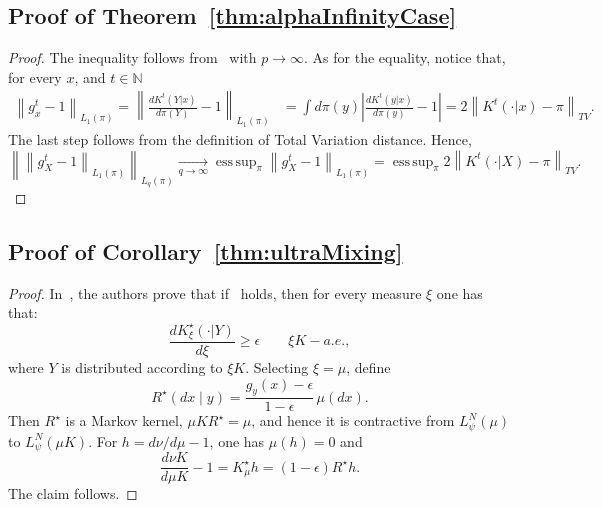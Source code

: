 \documentclass[11pt]{article}
\DeclareMathOperator*{\esssup}{ess\,sup}
\theoremstyle{plain}
\theoremstyle{remark}
\begin{document}
\subsection{Proof of Theorem~\ref{thm:alphaInfinityCase}}\label{app:proofAlphaInfinityCase}
\begin{proof}
    The inequality follows from~ with $p\to\infty$. As for the equality, notice that, for every $x$, and $t\in\mathbb{N}$
\begin{align}
    \left\lVert g^t_x -1  \right\rVert_{L_1(\pi)}  = \left\lVert \frac{dK^t(Y|x)}{d\pi(Y)}  -1  \right\rVert_{L_1(\pi)} &= \int d\pi(y) \left| \frac{dK^t(y|x)}{d\pi(y)} -1 \right| =2 \left\lVert K^t(\cdot |x)- \pi \right\rVert_{TV}.
\end{align}
The last step follows from the definition of Total Variation distance. Hence, 
\begin{equation}
    \left\lVert \left\lVert g^t_X -1  \right\rVert_{L_1(\pi)} \right\rVert_{L_q(\pi)}\xrightarrow[q\to\infty]{} \esssup_\pi \left\lVert g^t_X -1  \right\rVert_{L_1(\pi)} =  \esssup_\pi 2 \left\lVert K^t(\cdot |X)- \pi \right\rVert_{TV}.
\end{equation}

\end{proof}

\subsection{Proof of Corollary~\ref{thm:ultraMixing}}\label{app:proofUltraMixing}
\begin{proof}
  In~\cite[Lemma 4.1]{contractionLedoux},
    the authors prove that if~ holds, then for every measure $\xi$ one has that:
    \begin{equation}
        \frac{dK_\xi^\star(\cdot|Y)}{d\xi}\geq \epsilon \hspace{2em} \xi K-a.e.,
    \end{equation}
     where $Y$ is distributed according to $\xi K$.
    Selecting $\xi=\mu$, define
    \begin{equation}
        R^\star(dx\mid y)=\frac{g_y(x)-\epsilon}{1-\epsilon}\,\mu(dx).
    \end{equation}
    Then $R^\star$ is a Markov kernel, $\mu K R^\star=\mu$, and hence it is contractive from $L_\psi^N(\mu)$ to $L_\psi^N(\mu K)$. For $h=d\nu/d\mu-1$, one has $\mu(h)=0$ and
    \begin{equation}
        \frac{d\nu K}{d\mu K}-1=K_\mu^\star h=(1-\epsilon)R^\star h.
    \end{equation}
    The claim follows.
\end{proof}
\end{document}
